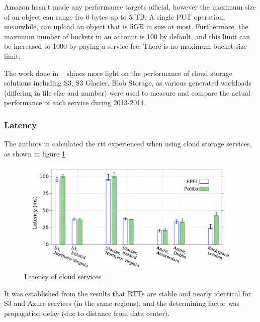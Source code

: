 Amazon hasn't made any performance targets official, however the maximum size of an object can range fro 0 bytes up to 5 TB. A single PUT operation, meanwhile, can upload an object that is 5GB in size at most. Furthermore, the maximum number of buckets in an account is 100 by default, and this limit can be increased to 1000 by paying a service fee. There is no maximum bucket size limit. ~\cite{s3faq, s3_limits}

The work done in ~\cite{s3vsblob_performance} shines more light on the performance of cloud storage solutions including S3, S3 Glacier, Blob Storage, as various generated workloads (differing in file size and number) were used to measure and compare the actual performance of each service during 2013-2014.

\subsubsection{Latency}
The authors in \cite{s3vsblob_performance} calculated the \ac{rtt} experienced when using cloud storage services, as shown in figure \ref{fig:latency}
\begin{figure} [h]
    \centering
    \includegraphics[scale=0.7]{images/latency}
    \caption{\label{fig:latency}Latency of cloud services}
\end{figure}


It was established from the results that RTTs are stable and nearly identical for S3 and Azure services (in the same regions), and the determining factor was propagation delay (due to distance from data center).

